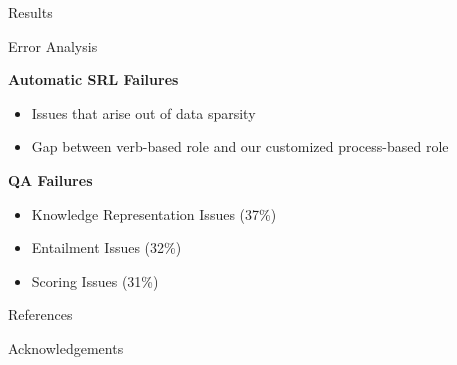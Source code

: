 \documentclass[final]{beamer}
\newlength{\onecolwid}
\begin{document}
\begin{frame}[t]
\begin{columns}[t]
\begin{column}{\onecolwid}
\begin{block}{Results}
\end{block}



\begin{block}{Error Analysis}

{\bf Automatic SRL Failures}
\begin{itemize}
	\item Issues that arise out of data sparsity
	\item Gap between verb-based role and our customized process-based role
\end{itemize}
\vspace{5mm}
{\bf QA Failures}
\begin{itemize}
	\item Knowledge Representation Issues (37\%)
	\item Entailment Issues (32\%)
	\item Scoring Issues (31\%) 
\end{itemize}

\end{block}
\vspace{-0.5in}

\begin{block}{References}

\nocite{*} %
\small{
\vspace{0in}}

\end{block}



\begin{block}{Acknowledgements}

\small{} \\


\end{block}
\end{column}
\end{columns}
\end{frame}
\end{document}

